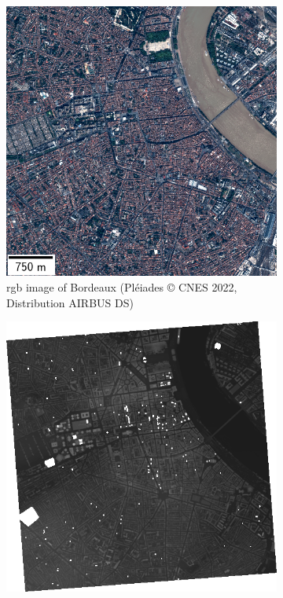 \begin{figure}
    \centering
    \begin{subfigure}[t]{0.48\linewidth}
        \flushleft
        \includegraphics[width=\linewidth]{Images/Chap_6/miniature_Bordeaux.png}
        \caption{\acrshort{rgb} image of Bordeaux (Pléiades © CNES 2022, Distribution AIRBUS DS)}
        \label{fig:miniature_Bordeaux_rgb}
    \end{subfigure}\hfill
    \begin{subfigure}[t]{0.48\linewidth}
        \flushright
        \includegraphics[width=\linewidth]{Images/Chap_6/miniature_Bordeaux_gt.png}

\end{subfigure}
\end{figure}
